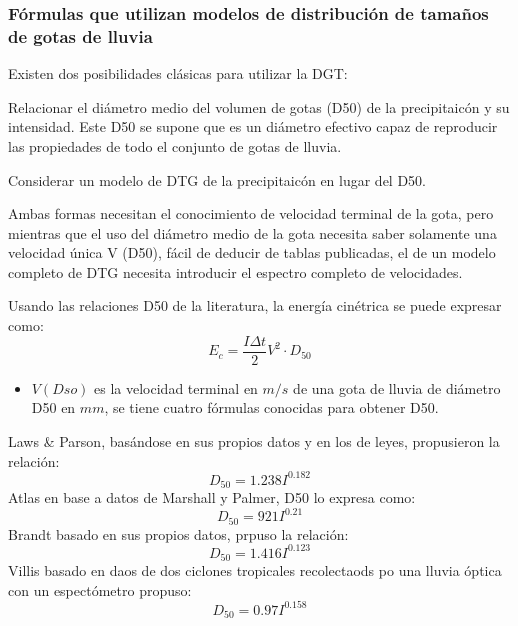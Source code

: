     \subsubsection{Fórmulas que utilizan modelos de distribución de tamaños de gotas de lluvia}
    Existen dos posibilidades clásicas para utilizar la DGT:
    
    Relacionar el diámetro medio del volumen de gotas (D50) de la precipitaicón y su intensidad. Este D50 se supone que es un diámetro efectivo capaz de reproducir las propiedades de todo el conjunto de gotas de lluvia.
    
    Considerar un modelo de DTG de la precipitaicón en lugar del D50.
    
    Ambas formas necesitan el conocimiento de velocidad terminal de la gota, pero mientras que el uso del diámetro medio de la gota necesita saber solamente una velocidad única V (D50), fácil de deducir de tablas publicadas, el de un modelo completo de DTG necesita introducir el espectro completo de velocidades.
    
    Usando las relaciones D50 de la literatura, la energía cinétrica se puede expresar como:
    \begin{equation}
        E_c = \frac{I\Delta t}{2}V^2 \cdot D_{50}
    \end{equation}
    
    \begin{notation}
        \begin{itemize}
            \item $V(Dso)$ es la velocidad terminal en $m/s$ de una gota de lluvia de diámetro D50 en $mm$, se tiene cuatro fórmulas conocidas para obtener D50.
        \end{itemize}
    \end{notation}
    Laws \& Parson, basándose en sus propios datos y en los de leyes, propusieron la relación:
    \begin{equation}
        D_{50}= 1.238I^{0.182}
    \end{equation}
    Atlas en base a datos de Marshall y Palmer, D50 lo expresa como:
    \begin{equation}
        D_{50} = 921 I^{0.21}
    \end{equation}
    Brandt basado en sus propios datos, prpuso la relación:
    \begin{equation}
        D_{50}= 1.416I^{0.123}
    \end{equation}
    Villis basado en daos de dos ciclones tropicales recolectaods po una lluvia óptica con un espectómetro propuso:
    \begin{equation}
        D_{50} = 0.97I^{0.158}
    \end{equation}
